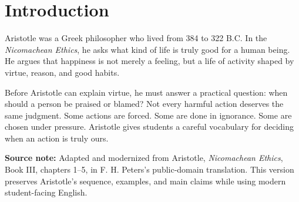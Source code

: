 \documentclass[12pt]{article}
\newcommand{\focusbox}[1]{%
\vspace{0.4em}\noindent\colorbox{gray!12}{\begin{minipage}{0.96\linewidth}#1\end{minipage}}\vspace{0.5em}}
\begin{document}
\section*{Introduction}
Aristotle was a Greek philosopher who lived from 384 to 322 B.C. In the \textit{Nicomachean Ethics}, he asks what kind of life is truly good for a human being. He argues that happiness is not merely a feeling, but a life of activity shaped by virtue, reason, and good habits.

Before Aristotle can explain virtue, he must answer a practical question: when should a person be praised or blamed? Not every harmful action deserves the same judgment. Some actions are forced. Some are done in ignorance. Some are chosen under pressure. Aristotle gives students a careful vocabulary for deciding when an action is truly ours.

\focusbox{\textbf{Source note:} Adapted and modernized from Aristotle, \textit{Nicomachean Ethics}, Book III, chapters 1--5, in F. H. Peters's public-domain translation. This version preserves Aristotle's sequence, examples, and main claims while using modern student-facing English.}
\end{document}
